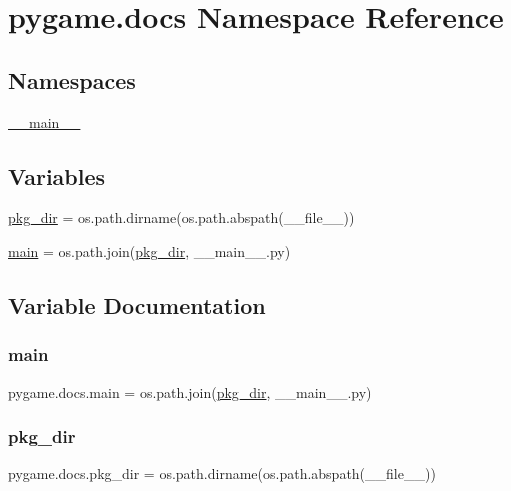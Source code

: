 \hypertarget{namespacepygame_1_1docs}{}\section{pygame.\+docs Namespace Reference}
\label{namespacepygame_1_1docs}
\subsection*{Namespaces}
\begin{DoxyCompactItemize}
\item 
 \hyperlink{namespacepygame_1_1docs_1_1____main____}{\+\_\+\+\_\+main\+\_\+\+\_\+}
\end{DoxyCompactItemize}
\subsection*{Variables}
\begin{DoxyCompactItemize}
\item 
\hyperlink{namespacepygame_1_1docs_a7816b52e96f80739920321a3b4a9085a}{pkg\+\_\+dir} = os.\+path.\+dirname(os.\+path.\+abspath(\+\_\+\+\_\+file\+\_\+\+\_\+))
\item 
\hyperlink{namespacepygame_1_1docs_a7e88c48c31890edea463a0485163a85f}{main} = os.\+path.\+join(\hyperlink{namespacepygame_1_1docs_a7816b52e96f80739920321a3b4a9085a}{pkg\+\_\+dir}, \textquotesingle{}\+\_\+\+\_\+main\+\_\+\+\_\+.\+py\textquotesingle{})
\end{DoxyCompactItemize}


\subsection{Variable Documentation}
\mbox{\label{namespacepygame_1_1docs_a7e88c48c31890edea463a0485163a85f}} 
\subsubsection{\texorpdfstring{main}{main}}
{\footnotesize\ttfamily pygame.\+docs.\+main = os.\+path.\+join(\hyperlink{namespacepygame_1_1docs_a7816b52e96f80739920321a3b4a9085a}{pkg\+\_\+dir}, \textquotesingle{}\+\_\+\+\_\+main\+\_\+\+\_\+.\+py\textquotesingle{})}

\mbox{\label{namespacepygame_1_1docs_a7816b52e96f80739920321a3b4a9085a}} 
\subsubsection{\texorpdfstring{pkg\+\_\+dir}{pkg\_dir}}
{\footnotesize\ttfamily pygame.\+docs.\+pkg\+\_\+dir = os.\+path.\+dirname(os.\+path.\+abspath(\+\_\+\+\_\+file\+\_\+\+\_\+))}

